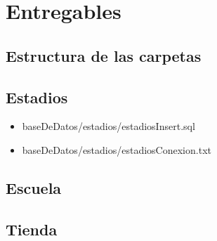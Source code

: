 
\section{Entregables}

\subsection{Estructura de las carpetas}

\subsection{Estadios}

\begin{itemize}
    \item baseDeDatos/estadios/estadiosInsert.sql
    \item baseDeDatos/estadios/estadiosConexion.txt
\end{itemize}

\subsection{Escuela}

\subsection{Tienda}



